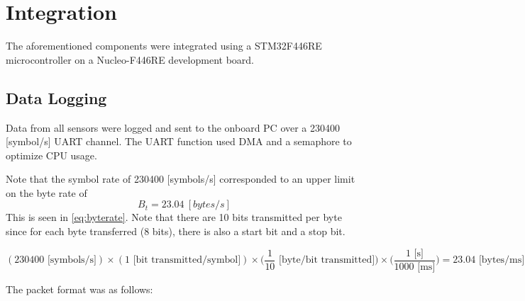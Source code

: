 \documentclass{article}
\begin{document}
%
%
%
%

\section{Integration} \label{integration}
The aforementioned components were integrated using a STM32F446RE microcontroller on a Nucleo-F446RE development board.

\subsection{Data Logging}
Data from all sensors were logged and sent to the onboard PC over a 230400 [symbol/s] UART channel. The UART function used DMA and a semaphore to optimize CPU usage.


Note that the symbol rate of 230400 [symbols/s] corresponded to an upper limit on the byte rate of 
$$B_t = 23.04 \ [bytes/s]$$
This is seen in \ref{eq:byterate}. Note that there are 10 bits transmitted per byte since for each byte transferred (8 bits), there is also a start bit and a stop bit.

\begin{equation}\label{eq:byterate}
(230400 \text{ [symbols/s]})
\times 
(1 \text{ [bit transmitted/symbol]})
\times
\Big(\frac{1}{10} \text{ [byte/bit transmitted]}\Big)
\times
\Big(\frac{1 \text{ [s]}}{1000 \text{ [ms]}}\Big)
=
23.04 \text{ [bytes/ms]}
\end{equation}


The packet format was as follows:
\end{document}
